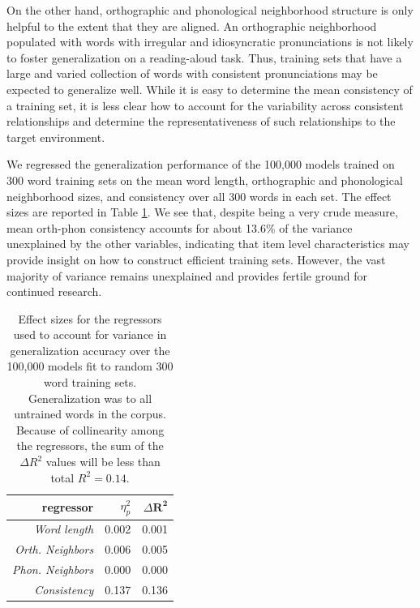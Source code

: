 \documentclass[10pt,letterpaper]{article}
\begin{document}
On the other hand, orthographic and phonological neighborhood structure is only helpful to the extent that they are aligned.
An orthographic neighborhood populated with words with irregular and idiosyncratic pronunciations is not likely to foster generalization on a reading-aloud task.
Thus, training sets that have a large and varied collection of words with consistent pronunciations may be expected to generalize well.
While it is easy to determine the mean consistency of a training set, it is less clear how to account for the variability across consistent relationships and determine the representativeness of such relationships to the target environment.

We regressed the generalization performance of the 100,000 models trained on 300 word training sets on the mean word length, orthographic and phonological neighborhood sizes, and consistency over all 300 words in each set.
The effect sizes are reported in Table \ref{tab:effectsize_model}.
We see that, despite being a very crude measure, mean orth-phon consistency accounts for about 13.6\% of the variance unexplained by the other variables, indicating that item level characteristics may provide insight on how to construct efficient training sets.
However, the vast majority of variance remains unexplained and provides fertile ground for continued research.

\begin{table}
	\begin{center}
	\begin{tabular}{r r r}
					\textbf{regressor} & $\eta^2_p$ & $\Delta \mathbf{R^2}$ \\
		\toprule
		\textit{Word length}       & 0.002 & 0.001 \\
		\textit{Orth. Neighbors}   & 0.006 & 0.005 \\
		\textit{Phon. Neighbors}   & 0.000 & 0.000 \\
		\textit{Consistency}       & 0.137 & 0.136 \\
		\bottomrule
		
	\end{tabular}
\end{center}
\caption{Effect sizes for the regressors used to account for variance in generalization accuracy over the 100,000 models fit to random 300 word training sets. Generalization was to all untrained words in the corpus. Because of collinearity among the regressors, the sum of the $\Delta R^2$ values will be less than total $R^2 = 0.14$.}
\label{tab:effectsize_model}
\end{table}
\end{document}
